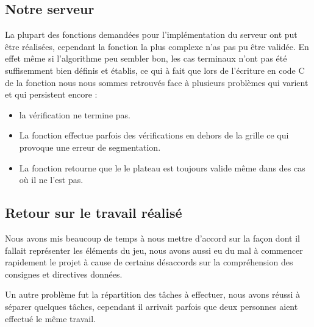 \documentclass[a4paper, draft]{article}
\begin{document}
\subsection{Notre serveur}

La plupart des fonctions demandées pour l'implémentation du serveur ont put être réalisées, cependant la fonction la plus complexe n'as pas pu être validée.
En effet même si l'algorithme peu sembler bon, les cas terminaux n'ont pas été suffisemment bien définis et établis, ce qui à fait que lors de l'écriture en code C de 
la fonction nous nous sommes retrouvés face à plusieurs problèmes qui varient et qui persistent encore :  
\begin{itemize}
  \item la vérification ne termine pas.
  \item La fonction effectue parfois des vérifications en dehors de la grille ce qui provoque une erreur de segmentation.
  \item La fonction retourne que le le plateau est toujours valide même dans des cas où il ne l'est pas. 
  \end{itemize}

\subsection{Retour sur le travail réalisé}
Nous avons mis beaucoup de temps à nous mettre d'accord sur la façon dont il fallait représenter les éléments du jeu, nous avons aussi eu du mal à commencer rapidement le projet
à cause de certains désaccords sur la compréhension des consignes et directives données.

Un autre problème fut la répartition des tâches à effectuer, nous avons réussi à séparer quelques tâches, cependant il arrivait parfois que deux personnes aient effectué le même travail.
\end{document}
